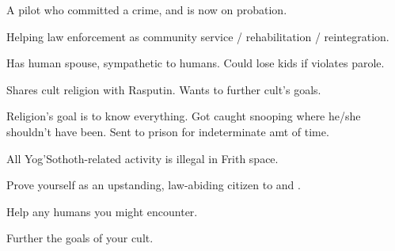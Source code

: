 \documentclass[char]{guildcamp4}
\begin{document}
\name{\cPilot{}}

\begin{itemz}[Backstory]
    \item A pilot who committed a crime, and is now on probation.
    \item Helping law enforcement as community service / rehabilitation / reintegration.
    \item Has human spouse, sympathetic to humans. Could lose kids if violates parole.
    \item Shares cult religion with Rasputin. Wants to further cult's goals.
    \item Religion's goal is to know everything. Got caught snooping where he/she shouldn't have been. Sent to prison for indeterminate amt of time.
    \item All Yog'Sothoth-related activity is illegal in Frith space.
\end{itemz}

\begin{itemz}[Goals]
	\item Prove yourself as an upstanding, law-abiding citizen to \cCbad{} and \cCgood{}.
	\item Help any humans you might encounter.
	\item Further the goals of your cult.
\end{itemz}

\begin{itemz}[Notes]
	\item 
\end{itemz}

\begin{contacts}
	\contact{\cTest{}}
\end{contacts}
\end{document}
